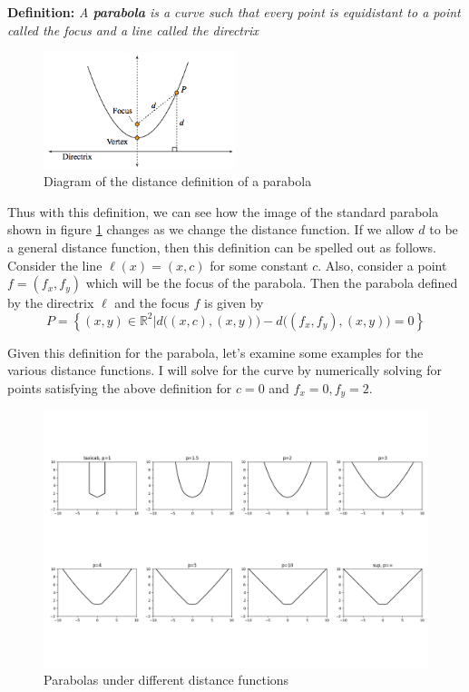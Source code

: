 \documentclass[a4paper, 12pt]{article}
\newcommand{\definition}[1]{
  \begin{minipage}[c]{0.85\textwidth}
    \vspace{2 em}
    \textbf{Definition:} \textit{#1}
    \vspace{2 em}
  \end{minipage}
}
\newcommand{\R}{\mathbb{R}}
\begin{document}
\definition{A \textbf{parabola} is a curve such that every point is equidistant to a point called the focus and a line called the directrix}


\begin{figure}[!hbt]
  \centering
  \includegraphics[width=0.5\textwidth]{directrix}
  \caption{Diagram of the distance definition of a parabola \cite{parabola}}
  \label{fig:directrix}
\end{figure}

Thus with this definition, we can see how the image of the standard parabola shown in figure \ref{fig:directrix} changes as we change the distance function. If we allow $d$ to be a general distance function, then this definition can be spelled out as follows. Consider the line $\ell(x) = (x,c)$ for some constant $c$. Also, consider a point $f=(f_x, f_y)$ which will be the focus of the parabola. Then the parabola defined by the directrix $\ell$ and the focus $f$ is given by
\begin{equation*}
  P = \left\{(x,y) \in\R^2\Big| d\big((x,c),(x,y)\big)-d\big((f_x,f_y),(x,y)\big)=0   \right\}
\end{equation*}

Given this definition for the parabola, let's examine some examples for the various distance functions. I will solve for the curve by numerically solving for points satisfying the above definition for $c = 0$ and $f_x=0, f_y = 2$.  

\begin{figure}[!hbt]
  \hspace{-3em}
  \includegraphics[width=1.15\columnwidth]{parabolas}
  \caption{Parabolas under different distance functions} 
\end{figure}
\end{document}

